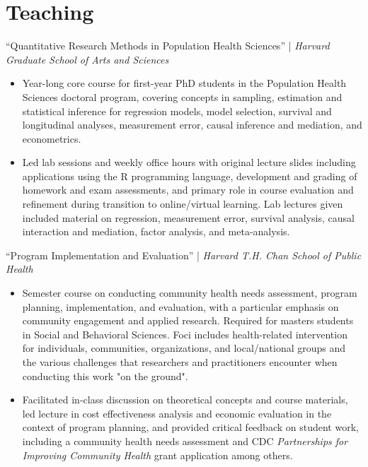 \documentclass{cv_style}
\begin{document}

\parskip -5pt 
\section{Teaching}

``Quantitative Research Methods in Population Health Sciences'' | \textit{Harvard Graduate School of Arts and Sciences}
\begin{itemize}
  \vspace{0em} \item Year-long core course for first-year PhD students in the Population Health Sciences doctoral program, covering concepts in sampling, estimation and statistical inference for regression models, model selection, survival and longitudinal analyses, measurement error, causal inference and mediation, and econometrics. 
  \item \parskip 1pt Led lab sessions and weekly office hours with original lecture slides including applications using the R programming language, development and grading of homework and exam assessments, and primary role in course evaluation and refinement during transition to online/virtual learning. Lab lectures given included material on regression, measurement error, survival analysis, causal interaction and mediation, factor analysis, and meta-analysis.
\end{itemize}

``Program Implementation and Evaluation'' | \textit{Harvard T.H. Chan School of Public Health}
\begin{itemize}
  \vspace{0em} \item Semester course on conducting community health needs assessment, program planning, implementation, and evaluation, with a particular emphasis on community engagement and applied research. Required for masters students in Social and Behavioral Sciences. Foci includes health-related intervention for individuals, communities, organizations, and local/national groups and the various challenges that researchers and practitioners encounter when conducting this work "on the ground". 
  \item \parskip 1pt Facilitated in-class discussion on theoretical concepts and course materials, led lecture in cost effectiveness analysis and economic evaluation in the context of program planning, and provided critical feedback on student work, including a community health needs assessment and CDC \textit{Partnerships for Improving Community Health} grant application among others. 
\end{itemize}
\end{document}
